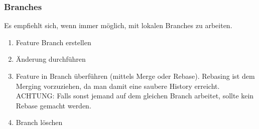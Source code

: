 \subsubsection{Branches}
Es empfiehlt sich, wenn immer möglich, mit lokalen Branches zu arbeiten.
\begin{enumerate}
	\item Feature Branch erstellen
	\item Änderung durchführen
	\item Feature in Branch überführen (mittels Merge oder Rebase). Rebasing ist dem Merging vorzuziehen, da man damit eine saubere History erreicht. ACHTUNG: Falls sonst jemand auf dem gleichen Branch arbeitet, sollte kein Rebase gemacht werden.
	\item Branch löschen
\end{enumerate}

